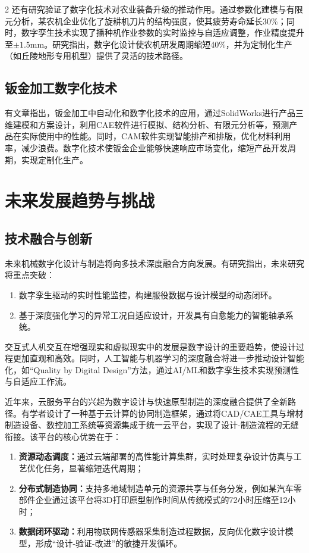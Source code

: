 \documentclass[fontset=windows,12pt,UTF8]{ctexart}
\begin{document}
\begin{multicols}{2}
	还有研究验证了数字化技术对农业装备升级的推动作用。通过参数化建模与有限元分析，某农机企业优化了旋耕机刀片的结构强度，使其疲劳寿命延长30\%；同时，数字孪生技术实现了播种机作业参数的实时监控与自适应调整，作业精度提升至$\pm 1.5\mathrm{mm}$。研究指出，数字化设计使农机研发周期缩短40\%，并为定制化生产（如丘陵地形专用机型）提供了灵活的技术路径\cite{geng_research_2017}。

	\subsection{钣金加工数字化技术}

	有文章指出，钣金加工中自动化和数字化技术的应用，通过SolidWorks进行产品三维建模和方案设计，利用CAE软件进行模拟、结构分析、有限元分析等，预测产品在实际使用中的性能。同时，CAM软件实现智能排产和排版，优化材料利用率，减少浪费\cite{__2025-6}。数字化技术使钣金企业能够快速响应市场变化，缩短产品开发周期，实现定制化生产。

	\section{未来发展趋势与挑战}

	\subsection{技术融合与创新}

	未来机械数字化设计与制造将向多技术深度融合方向发展。有研究指出，未来研究将重点突破：

	\begin{enumerate}
		\item 数字孪生驱动的实时性能监控，构建服役数据与设计模型的动态闭环。
		\item 基于深度强化学习的异常工况自适应设计，开发具有自愈能力的智能轴承系统\cite{__2025-8}。
	\end{enumerate}

	交互式人机交互在增强现实和虚拟现实中的发展是数字设计的重要趋势，使设计过程更加直观和高效\cite{li_digital_2024}。同时，人工智能与机器学习的深度融合将进一步推动设计智能化，如“Quality by Digital Design”方法\cite{ijjeh_quality_2025}，通过AI/ML和数字孪生技术实现预测性与自适应工作流。

	近年来，云服务平台的兴起为数字设计与快速原型制造的深度融合提供了全新路径。有学者设计了一种基于云计算的协同制造框架，通过将CAD/CAE工具与增材制造设备、数控加工系统等资源集成于统一云平台，实现了设计-制造流程的无缝衔接。该平台的核心优势在于：

	\begin{enumerate}
		\item \textbf{资源动态调度：}通过云端部署的高性能计算集群，实时处理复杂设计仿真与工艺优化任务，显著缩短迭代周期；
		\item \textbf{分布式制造协同：}支持多地域制造单元的资源共享与任务分发，例如某汽车零部件企业通过该平台将3D打印原型制作时间从传统模式的72小时压缩至12小时；
		\item \textbf{数据闭环驱动：}利用物联网传感器采集制造过程数据，反向优化数字设计模型，形成“设计-验证-改进”的敏捷开发循环。
	\end{enumerate}


\end{multicols}
\end{document}
